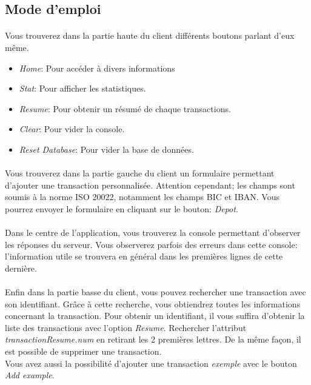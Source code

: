 \documentclass{article}
\begin{document}
    \subsection{Mode d’emploi}
      \paragraph{}
	Vous trouverez dans la partie haute du client différents boutons parlant d'eux même. 
	\begin{itemize}
	 \item \emph{Home}: Pour accéder à divers informations
	 \item \emph{Stat}: Pour afficher les statistiques.
	 \item \emph{Resume}: Pour obtenir un résumé de chaque transactions.
	 \item \emph{Clear}: Pour vider la console.
	 \item \emph{Reset Database}: Pour vider la base de données.
	\end{itemize}

      \paragraph{}
	Vous trouverez dans la partie gauche du client un formulaire permettant d'ajouter une transaction personnalisée.
	Attention cependant; les champs sont soumis à la norme ISO 20022, notamment les champs BIC et IBAN.
	Vous pourrez envoyer le formulaire en cliquant sur le bouton: \emph{Depot}.
      \paragraph{}
	Dans le centre de l'application, vous trouverez la console permettant d'observer les réponses du serveur.
	Vous observerez parfois des erreurs dans cette console: l'information utile se trouvera en général dans les premières lignes de cette dernière.
      \paragraph{}
	Enfin dans la partie basse du client, vous pouvez rechercher une transaction avec son identifiant.
	Grâce à cette recherche, vous obtiendrez toutes les informations concernant la transaction.
	Pour obtenir un identifiant, il vous suffira d'obtenir la liste des transactions avec l'option \emph{Resume}.
	Rechercher l'attribut \emph{transactionResume.num} en retirant les 2 premières lettres.
	De la même façon, il est possible de supprimer une transaction.\\
	Vous avez aussi la possibilité d'ajouter une transaction \emph{exemple} avec le bouton \emph{Add example}.
\end{document}
